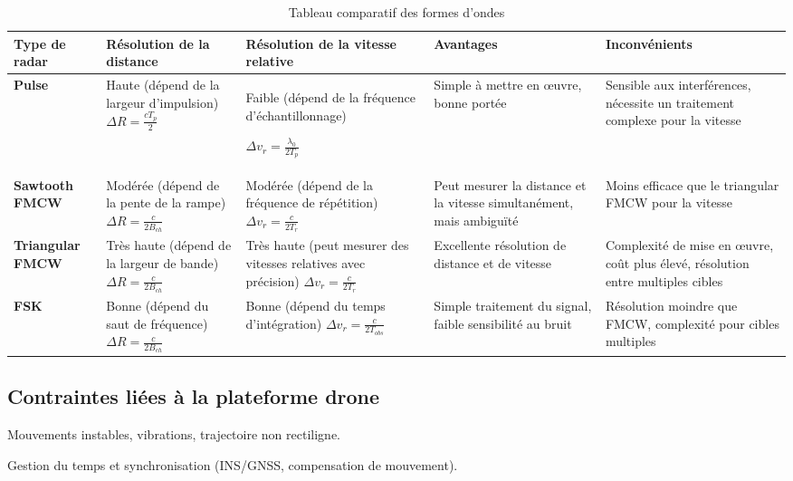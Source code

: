 \begin{table}[ht]
\centering
\begin{tabular}{|>{\centering\arraybackslash}p{2.75cm}|>{\centering\arraybackslash}p{2.75cm}|>{\centering\arraybackslash}p{2.75cm}|>{\centering\arraybackslash}p{2.75cm}|>{\centering\arraybackslash}p{2.75cm}|}\hline
\textbf{Type de radar} & \textbf{Résolution de la distance} & \textbf{Résolution de la vitesse relative} & \textbf{Avantages} & \textbf{Inconvénients} \\
\hline
\textbf{Pulse} & Haute (dépend de la largeur d'impulsion)  
$\Delta R = \frac{c T_p}{2}$  & Faible (dépend de la fréquence d'échantillonnage)
\par $\Delta v_r = \frac{\lambda_0}{2T_p}$ & Simple à mettre en œuvre, bonne portée & Sensible aux interférences, nécessite un traitement complexe pour la vitesse \\
\hline
\textbf{Sawtooth FMCW} & Modérée (dépend de la pente de la rampe)
$\Delta R = \frac{c}{2 B_{ch}}$ & Modérée (dépend de la fréquence de répétition) 
$\Delta v_r = \frac{c}{2 T_r}$ & Peut mesurer la distance et la vitesse simultanément, mais ambiguïté & Moins efficace que le triangular FMCW pour la vitesse\\
\hline
\textbf{Triangular FMCW} & Très haute (dépend de la largeur de bande)
$\Delta R = \frac{c}{2 B_{ch}}$ & Très haute (peut mesurer des vitesses relatives avec précision) 
$\Delta v_r = \frac{c}{2 T_r}$ & Excellente résolution de distance et de vitesse & Complexité de mise en œuvre, coût plus élevé, résolution entre multiples cibles \\
\hline
\textbf{FSK} & Bonne (dépend du saut de fréquence)
$\Delta R = \frac{c}{2 B_{ch}}$ & Bonne (dépend du temps d'intégration)
$\Delta v_r = \frac{c}{2 T_{obs}}$ & Simple traitement du signal, faible sensibilité au bruit & Résolution moindre que FMCW, complexité pour cibles multiples \\
\hline
\end{tabular}
\caption{Tableau comparatif des formes d'ondes}
\end{table}


\subsection{Contraintes liées à la plateforme drone}

Mouvements instables, vibrations, trajectoire non rectiligne.

Gestion du temps et synchronisation (INS/GNSS, compensation de mouvement).


